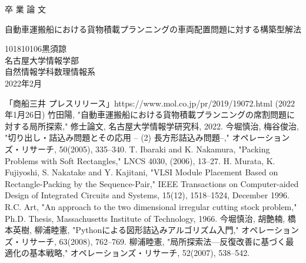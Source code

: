 \documentclass[platex]{jreport}
\begin{document}
\begin{table}[b]
\begin{center}
{\huge 卒\hspace{0.1cm} 業\hspace{0.1cm} 論\hspace{0.1cm} 文}\\[2.5cm]
\begin{spacing}{1.5}
	{\huge 自動車運搬船における貨物積載プランニングの車両配置問題に対する構築型解法}\\[6cm]
\end{spacing}
{\huge 101810106\qquad 黒須諒}\\[1cm]
{\huge 名古屋大学情報学部}\\[0.5cm]
{\huge 自然情報学科数理情報系}\\[0.5cm]
{\huge 2022年2月}\\
\end{center}
\end{table} 


\thispagestyle{empty} 
\clearpage
\newpage
{}
\setcounter{page}{1}



% 



\thispagestyle{empty} 
\tableofcontents
\newpage
\setcounter{page}{1}
\pagestyle{plain}







% 







\begin{thebibliography}{99}
	「商船三井 プレスリリース」https://www.mol.co.jp/pr/2019/19072.html (2022年1月26日)
	竹田陽, "自動車運搬船における貨物積載プランニングの席割問題に対する局所探索," 修士論文, 名古屋大学情報学研究科, 2022.
	今堀慎治, 梅谷俊治, "切り出し・詰込み問題とその応用 -- (2) 長方形詰込み問題--," オペレーションズ・リサーチ, 50(2005), 335--340.
	T. Ibaraki and K. Nakamura, "Packing Problems with Soft Rectangles," LNCS 4030, (2006), 13--27.
	H. Murata, K. Fujiyoshi, S. Nakatake and Y. Kajitani, "VLSI Module Placement Based on Rectangle-Packing by the Sequence-Pair," 
	IEEE Transactions on Computer-aided Design of Integrated Circuits and Systems, 15(12), 1518--1524, December 1996.
	R.C. Art, "An approach to the two dimensional irregular cutting stock problem,"
	Ph.D. Thesis, Massachusetts Institute of Technology, 1966.
	今堀慎治, 胡艶楠, 橋本英樹, 柳浦睦憲, "Pythonによる図形詰込みアルゴリズム入門," 
	オペレーションズ・リサーチ, 63(2008), 762--769.
	柳浦睦憲, "局所探索法—反復改善に基づく最適化の基本戦略," オペレーションズ・リサーチ, 52(2007), 538--542.

\end{thebibliography}
\end{document}
